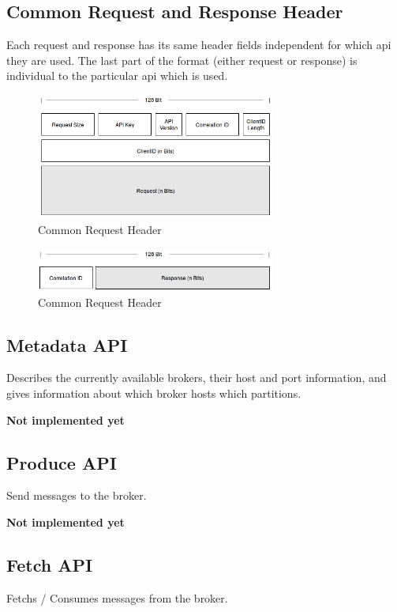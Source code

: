 \subsection{Common Request and Response Header}
Each request and response has its same header fields independent for which api they are used. 
The last part of the format (either request or response) is individual to the particular api which is used. 
\begin{figure}[H]
    \centering
    \includegraphics[width=0.7\textwidth]{images/protocol-request-header.png}
    \caption{Common Request Header}
    \label{fig:protocol-request-header.png}
\end{figure}

\begin{figure}[H]
    \centering
    \includegraphics[width=0.7\textwidth]{images/protocol-response-header.png}
    \caption{Common Request Header}
    \label{fig:protocol-response-header.png}
\end{figure}

\subsection{Metadata API}
Describes the currently available brokers, their host and port information, and
gives information about which broker hosts which partitions.

\textbf{Not implemented yet}

\subsection{Produce API}
Send messages to the broker.

\textbf{Not implemented yet}

\subsection{Fetch API}
Fetchs / Consumes messages from the broker.
